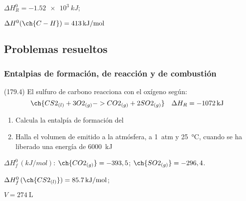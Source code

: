   \begin{solution}
    \begin{enumerate*}
      \item \( \Delta H^0_R = \SI{-1.52e3}{kJ} \); \item \( \Delta H^0 (\ch{C-H}) = \SI{413}{kJ/mol} \)
    \end{enumerate*}
  \end{solution}






  \subsection*{Problemas resueltos}

  \subsubsection*{Entalpias de formación, de reacción y de combustión}

  \begin{exercise}[
      tags    = {},
      topics  = {química, termodinámica, termoquímica},
      source  = {FQ 1B MGH 2016, p179, e4},
    ]
    (179.4) El sulfuro de carbono reacciona con el oxígeno según:
     \[ \ch{CS2_{(l)} + 3 O2_{(g)} -> CO2_{(g)} + 2 SO2_{(g)}} \quad \Delta H_R = \SI{-1072}{kJ} \]
    \begin{enumerate}
      \item Calcula la entalpía de formación del 
      \item Halla el volumen de  emitido a la atmósfera, a \SI{1}{atm} y \SI{25}{\celsius}, cuando se ha liberado una energía de \SI{6000}{kJ}
    \end{enumerate}

    \begin{gexdatos}
      \( \Delta H^0_f\,(\si{kJ/mol}) \): \( \ch{CO2_{(g)}} = -393,5 \); \( \ch{SO2_{(g)}} = -296,4 \).
    \end{gexdatos}

  \end{exercise}

  \begin{solution}
    \begin{enumerate*}
      \item \( \Delta H^0_f\,(\ch{CS2_{(l)}}) = \SI{85.7}{kJ/mol} \); \item \( V = \SI{274}{\liter} \)
    \end{enumerate*}
  \end{solution}




